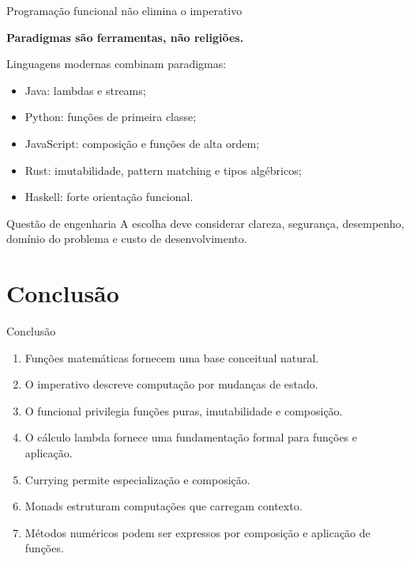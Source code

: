 \documentclass[aspectratio=169,11pt]{beamer}
\begin{document}
\begin{frame}{Programação funcional não elimina o imperativo}
    \begin{center}\Large\textbf{Paradigmas são ferramentas, não religiões.}\end{center}
    \vspace{0.3cm}
    Linguagens modernas combinam paradigmas:
    \begin{itemize}
        \item Java: lambdas e streams;
        \item Python: funções de primeira classe;
        \item JavaScript: composição e funções de alta ordem;
        \item Rust: imutabilidade, pattern matching e tipos algébricos;
        \item Haskell: forte orientação funcional.
    \end{itemize}
    \begin{block}{Questão de engenharia}
        A escolha deve considerar clareza, segurança, desempenho, domínio do problema e custo de desenvolvimento.
    \end{block}
\end{frame}

\section{Conclusão}

\begin{frame}{Conclusão}
    \begin{enumerate}
        \item Funções matemáticas fornecem uma base conceitual natural.
        \item O imperativo descreve computação por mudanças de estado.
        \item O funcional privilegia funções puras, imutabilidade e composição.
        \item O cálculo lambda fornece uma fundamentação formal para funções e aplicação.
        \item Currying permite especialização e composição.
        \item Monads estruturam computações que carregam contexto.
        \item Métodos numéricos podem ser expressos por composição e aplicação de funções.
    \end{enumerate}
\end{frame}
\end{document}
